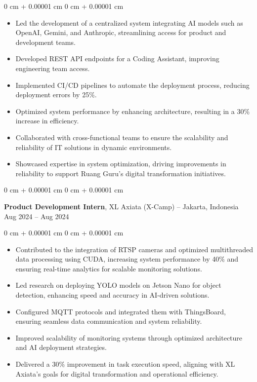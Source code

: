 \documentclass[10pt, a4paper]{article}
\newenvironment{highlights}{
    \begin{itemize}[
        topsep=0.10 cm,
        parsep=0.10 cm,
        partopsep=0pt,
        itemsep=0pt,
        leftmargin=0 cm + 10pt
    ]
}{
    \end{itemize}
} %
\newenvironment{onecolentry}{
    \begin{adjustwidth}{
        0 cm + 0.00001 cm
    }{
        0 cm + 0.00001 cm
    }
}{
    \end{adjustwidth}
} %
\newenvironment{twocolentry}[2][]{
    \onecolentry
    \def\secondColumn{#2}
    \setcolumnwidth{\fill, 4.5 cm}
    \begin{paracol}{2}
}{
    \switchcolumn \raggedleft \secondColumn
    \end{paracol}
    \endonecolentry
} %
\begin{document}
        \vspace{0.10 cm}
        \begin{onecolentry}
            \begin{highlights}
                \item Led the development of a centralized system integrating AI models such as OpenAI, Gemini, and Anthropic, streamlining access for product and development teams.
                \item Developed REST API endpoints for a Coding Assistant, improving engineering team access.
                \item Implemented CI/CD pipelines to automate the deployment process, reducing deployment errors by 25\%.
                \item Optimized system performance by enhancing architecture, resulting in a 30\% increase in efficiency.
                \item Collaborated with cross-functional teams to ensure the scalability and reliability of IT solutions in dynamic environments.
                \item Showcased expertise in system optimization, driving improvements in reliability to support Ruang Guru's digital transformation initiatives.
            \end{highlights}
        \end{onecolentry}


        \vspace{0.2 cm}

        \begin{twocolentry}{
            Aug 2024 – Aug 2024
        }
            \textbf{Product Development Intern}, XL Axiata (X-Camp) -- Jakarta, Indonesia\end{twocolentry}

        \vspace{0.10 cm}
        \begin{onecolentry}
            \begin{highlights}
                \item Contributed to the integration of RTSP cameras and optimized multithreaded data processing using CUDA, increasing system performance by 40\% and ensuring real-time analytics for scalable monitoring solutions.
                \item Led research on deploying YOLO models on Jetson Nano for object detection, enhancing speed and accuracy in AI-driven solutions.
                \item Configured MQTT protocols and integrated them with ThingsBoard, ensuring seamless data communication and system reliability.
                \item Improved scalability of monitoring systems through optimized architecture and AI deployment strategies.
                \item Delivered a 30\% improvement in task execution speed, aligning with XL Axiata's goals for digital transformation and operational efficiency.
            \end{highlights}
        \end{onecolentry}
\end{document}
